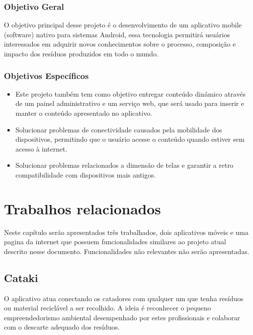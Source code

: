 \documentclass[
	12pt,				%
	openright,			%
	twoside,			%
	a4paper,			%
	english,			%
	french,				%
	spanish,			%
	brazil				%
	]{abntex2}
\begin{document}
\subsection{Objetivo Geral}
O objetivo principal desse projeto é o desenvolvimento de um aplicativo mobile (software) nativo para sistemas Android, essa tecnologia permitirá usuários interessados em adquirir novos conhecimentos sobre o processo, composição e impacto dos resíduos produzidos em todo o mundo.

\subsection{Objetivos Específicos}
\begin{itemize}
	\item Este projeto também tem como objetivo entregar conteúdo dinâmico através de um painel administrativo e um serviço web, que será usado para inserir e manter o conteúdo apresentado no aplicativo.
    \item Solucionar problemas de conectividade causados pela mobilidade dos dispositivos, permitindo que o usuário acesse o conteúdo quando estiver sem acesso à internet.
        \item Solucionar problemas relacionados a dimensão de telas e garantir a retro compatibilidade com dispositivos mais antigos.
\end{itemize}

\chapter{Trabalhos relacionados}

Neste capítulo serão apresentados três trabalhados, dois aplicativos móveis e uma pagina da internet que possuem funcionalidades similares ao projeto atual descrito nesse documento. Funcionalidades não relevantes não serão apresentadas.

\section{Cataki}
O aplicativo atua conectando os catadores com qualquer um que tenha resíduos ou material reciclável a ser recolhido. A ideia é reconhecer o pequeno empreendedorismo ambiental desempenhado por estes profissionais e colaborar com o descarte adequado dos resíduos.
\end{document}
